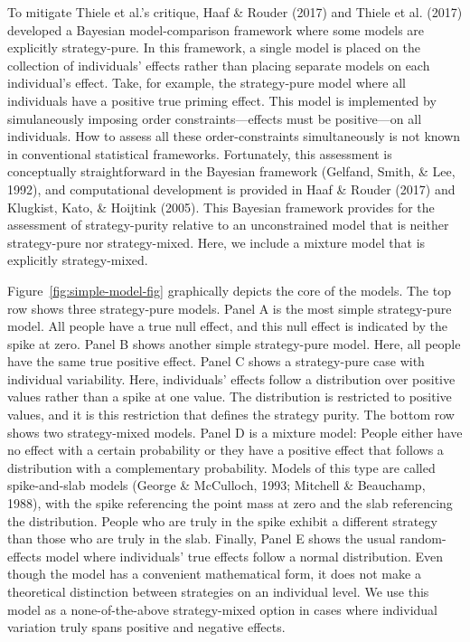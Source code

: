 \documentclass[english,man]{apa6}
\theoremstyle{definition}
\theoremstyle{definition}
\theoremstyle{remark}
\begin{document}
To mitigate Thiele et al.'s critique, Haaf \& Rouder (2017) and Thiele
et al. (2017) developed a Bayesian model-comparison framework where some
models are explicitly strategy-pure. In this framework, a single model
is placed on the collection of individuals' effects rather than placing
separate models on each individual's effect. Take, for example, the
strategy-pure model where all individuals have a positive true priming
effect. This model is implemented by simulaneously imposing order
constraints---effects must be positive---on all individuals. How to
assess all these order-constraints simultaneously is not known in
conventional statistical frameworks. Fortunately, this assessment is
conceptually straightforward in the Bayesian framework (Gelfand, Smith,
\& Lee, 1992), and computational development is provided in Haaf \&
Rouder (2017) and Klugkist, Kato, \& Hoijtink (2005). This Bayesian
framework provides for the assessment of strategy-purity relative to an
unconstrained model that is neither strategy-pure nor strategy-mixed.
Here, we include a mixture model that is explicitly strategy-mixed.

Figure~\ref{fig:simple-model-fig} graphically depicts the core of the
models. The top row shows three strategy-pure models. Panel A is the
most simple strategy-pure model. All people have a true null effect, and
this null effect is indicated by the spike at zero. Panel B shows
another simple strategy-pure model. Here, all people have the same true
positive effect. Panel C shows a strategy-pure case with individual
variability. Here, individuals' effects follow a distribution over
positive values rather than a spike at one value. The distribution is
restricted to positive values, and it is this restriction that defines
the strategy purity. The bottom row shows two strategy-mixed models.
Panel D is a mixture model: People either have no effect with a certain
probability or they have a positive effect that follows a distribution
with a complementary probability. Models of this type are called
spike-and-slab models (George \& McCulloch, 1993; Mitchell \& Beauchamp,
1988), with the spike referencing the point mass at zero and the slab
referencing the distribution. People who are truly in the spike exhibit
a different strategy than those who are truly in the slab. Finally,
Panel E shows the usual random-effects model where individuals' true
effects follow a normal distribution. Even though the model has a
convenient mathematical form, it does not make a theoretical distinction
between strategies on an individual level. We use this model as a
none-of-the-above strategy-mixed option in cases where individual
variation truly spans positive and negative effects.
\end{document}
